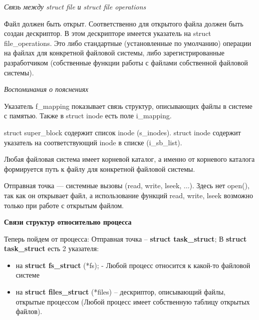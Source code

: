 \newpage

\textit{Связь между struct file и struct file operations}

Файл должен быть открыт. Соответственно для открытого файла должен быть создан дескриптор. В этом дескрипторе имеется указатель на struct file\_operations. Это либо стандартные (установленные по умолчанию) операции на файлах для конкретной файловой системы, либо зарегистрированные разработчиком (собственные функции работы с файлами собственной файловой системы).

\textit{Воспоминания о пояснениях}

Указатель f\_mapping показывает связь структур, описывающих файлы в системе с памятью. Также в struct inode есть поле i\_mapping.

struct super\_block содержит список inode (s\_inodes). struct inode содержит указатель на соответствующий inode в списке (i\_sb\_list).

Любая файловая система имеет корневой каталог, а именно от корневого каталога формируется путь к файлу для конкретной файловой системы.

Отправная точка — системные вызовы (read, write, lseek, ...). Здесь нет open(), так как он открывает файл, а использование функций read, write, lseek возможно только при работе с открытым файлом.

\textbf{Связи структур относительно процесса}
\par Теперь пойдем от процесса: Отправная точка -- \textbf{struct task\_struct};
В \textbf{struct task\_struct} есть 2 указателя: 
\begin{itemize}
\item на \textbf{struct fs\_struct} (*fs); - Любой процесс относится к какой-то файловой системе
\item на \textbf{struct files\_struct} (*files) -- дескриптор, описывающий файлы, открытые процессом (Любой процесс имеет собственную таблицу открытых файлов).
\end{itemize}

